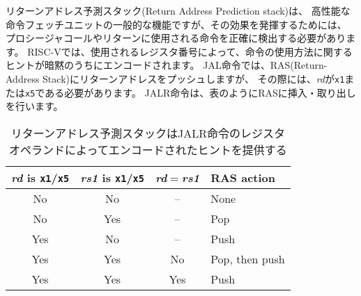 リターンアドレス予測スタック(Return Address Prediction stack)は、
高性能な命令フェッチユニットの一般的な機能ですが、その効果を発揮するためには、
プロシージャコールやリターンに使用される命令を正確に検出する必要があります。
RISC-Vでは、使用されるレジスタ番号によって、命令の使用方法に関するヒントが暗黙のうちにエンコードされます。
JAL命令では、RAS(Return-Address Stack)にリターンアドレスをプッシュしますが、
その際には、{\em rd}が{\tt x1}または{\tt x5}である必要があります。
JALR命令は、表のようにRASに挿入・取り出しを行います。

\begin{table}[hbt]
\centering
\begin{tabular}{|c|c|c|l|}
  \hline
  \textit{rd} is \texttt{x1}/\texttt{x5}
      & \textit{rs1} is \texttt{x1}/\texttt{x5}
            & \textit{rd}$=$\textit{rs1} & RAS action \\
  \hline
  No  & No  & --  & None \\
  No  & Yes & --  & Pop \\
  Yes & No  & --  & Push \\
  Yes & Yes & No  & Pop, then push \\
  Yes & Yes & Yes & Push \\
   \hline
\end{tabular}
\begin{comment}
\caption{Return-address stack prediction hints encoded in the register
  operands of a JALR instruction.}
\end{comment}
\caption{リターンアドレス予測スタックはJALR命令のレジスタオペランドによってエンコードされたヒントを提供する}
\label{rashints}
\end{table}

